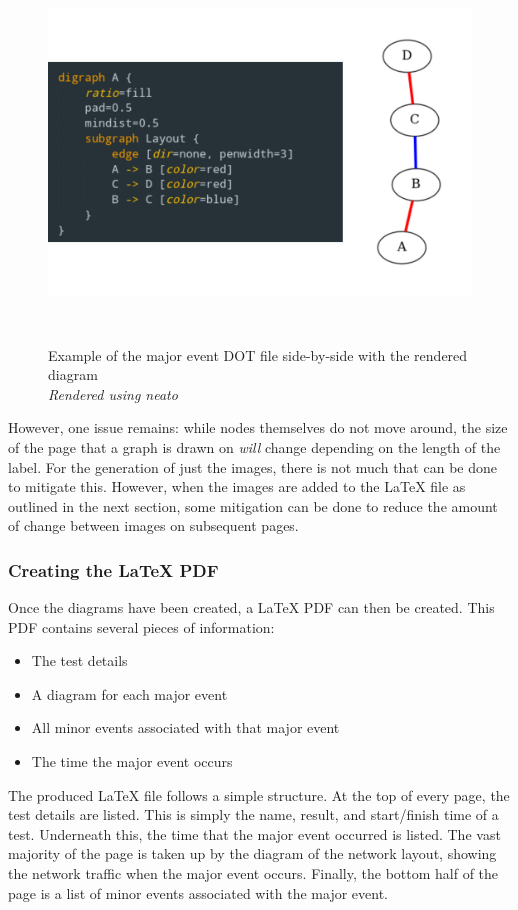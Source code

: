 \begin{figure}
    \begin{centering}
        \includegraphics[width=15cm,height=10cm,keepaspectratio]{Figures/Chapter5-DotAndRender.png}
        \caption{Example of the major event DOT file side-by-side with the rendered diagram\\\emph{Rendered using neato}}
        \label{fig:chapter5TEMP}
    \end{centering}
\end{figure}


However, one issue remains: while nodes themselves do not move around, the size of the page that a graph is drawn on \emph{will} change depending on the length of the label.
For the generation of just the images, there is not much that can be done to mitigate this. 
However, when the images are added to the LaTeX file as outlined in the next section, some mitigation can be done to reduce the amount of change between images on subsequent pages. 

\subsubsection{Creating the LaTeX PDF}
Once the diagrams have been created, a LaTeX PDF can then be created.
This PDF contains several pieces of information:
\begin{itemize}
    \item The test details
    \item A diagram for each major event
    \item All minor events associated with that major event
    \item The time the major event occurs
\end{itemize}
The produced LaTeX file follows a simple structure.
At the top of every page, the test details are listed. This is simply the name, result, and start/finish time of a test.
Underneath this, the time that the major event occurred is listed. 
The vast majority of the page is taken up by the diagram of the network layout, showing the network traffic when the major event occurs.
Finally, the bottom half of the page is a list of minor events associated with the major event.


